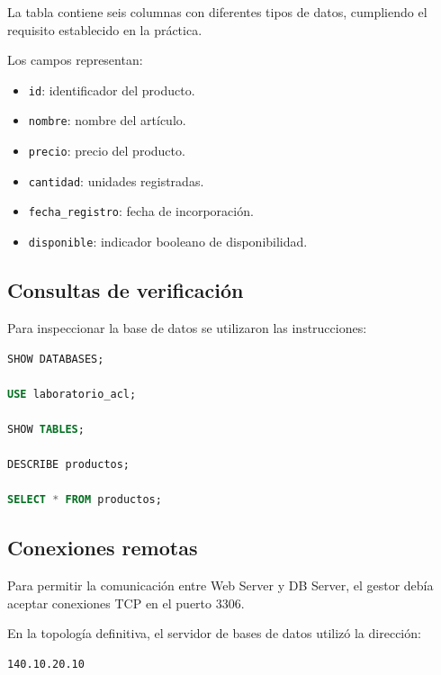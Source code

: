 \documentclass[12pt,a4paper]{article}
\begin{document}
La tabla contiene seis columnas
con diferentes tipos de datos,
cumpliendo el requisito establecido
en la práctica.

Los campos representan:

\begin{itemize}
    \item \texttt{id}: identificador
    del producto.

    \item \texttt{nombre}: nombre
    del artículo.

    \item \texttt{precio}: precio
    del producto.

    \item \texttt{cantidad}: unidades
    registradas.

    \item \texttt{fecha\_registro}:
    fecha de incorporación.

    \item \texttt{disponible}:
    indicador booleano de disponibilidad.
\end{itemize}

\subsection{Consultas de verificación}

Para inspeccionar la base de datos
se utilizaron las instrucciones:

\begin{lstlisting}[language=SQL]
SHOW DATABASES;

USE laboratorio_acl;

SHOW TABLES;

DESCRIBE productos;

SELECT * FROM productos;
\end{lstlisting}


\subsection{Conexiones remotas}

Para permitir la comunicación
entre Web Server y DB Server,
el gestor debía aceptar conexiones
TCP en el puerto 3306.

En la topología definitiva,
el servidor de bases de datos
utilizó la dirección:

\begin{lstlisting}
140.10.20.10
\end{lstlisting}
\end{document}
